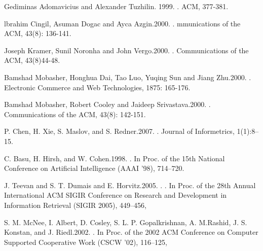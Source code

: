 \begin{thebibliography}{10}
Gediminas Adomavicius and Alexander Tuzhilin. 1999.
.
\newblock ACM, 377-381.

lbrahim Cingil, Asuman Dogac and Ayca Azgin.2000.
.
\newblock mmunications of the ACM, 43(8): 136-141.

Joseph Kramer, Sunil Noronha and John Vergo.2000.
.
\newblock Communications of the ACM, 43(8)44-48.

Bamshad Mobasher, Honghua Dai, Tao Luo, Yuqing Sun and Jiang Zhu.2000.
.
\newblock Electronic Commerce and Web Technologies, 1875: 165-176.

Bamshad Mobasher, Robert Cooley and Jaideep Srivastava.2000.
.
\newblock Communications of the ACM, 43(8): 142-151.

P. Chen, H. Xie, S. Maslov, and S. Redner.2007.
.
\newblock Journal of Informetrics, 1(1):8--15.

C. Basu, H. Hirsh, and W. Cohen.1998.
.
\newblock In Proc. of the 15th National Conference on Artificial Intelligence (AAAI ’98), 714–720.

J. Teevan and S. T. Dumais and E. Horvitz.2005.
.
\newblock . In Proc. of the 28th Annual International ACM SIGIR Conference on Research and Development in Information Retrieval (SIGIR 2005), 449–456,

S. M. McNee, I. Albert, D. Cosley, S. L. P. Gopalkrishnan, A. M.Rashid, J. S. Konstan, and J. Riedl.2002.
.
\newblock  In Proc. of the 2002 ACM Conference on Computer Supported Cooperative Work (CSCW ’02), 116–125,
\end{thebibliography}
